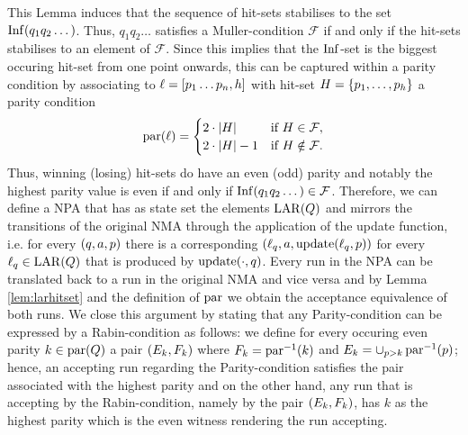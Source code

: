 This Lemma induces that the sequence of hit-sets stabilises to the set
$\operatorname{Inf}(q_{1}q_{2}\dots)$. Thus, $q_{1}q_{2}\dots$ satisfies a Muller-condition
$\mathcal{F}$ if and only if the hit-sets stabilises to an element of
$\mathcal{F}$. Since this implies that the $\operatorname{Inf}$-set is the biggest occuring 
hit-set from one point onwards, this can be captured within a parity
condition by associating to $\ell = \left[p_{1}\dots p_{n},h\right]$ with
hit-set $H = \left\{p_{1},\dots,p_{h}\right\}$ a parity condition
\begin{equation*}
  \operatorname{par}(\ell) = \begin{cases}
    2\cdot\left\vert{H}\right\vert &\text{if }H\in\mathcal{F},\\
    2\cdot\left\vert{H}\right\vert-1 &\text{if }H\notin\mathcal{F}.
  \end{cases}
\end{equation*}
Thus, winning (losing) hit-sets do have an even (odd) parity and notably the
highest parity value is even if and only if
$\operatorname{Inf}(q_{1}q_{2}\dots)\in\mathcal{F}$. Therefore, we can define a \ac{NPA}
that has as state set the elements $\operatorname{LAR}(Q)$ and mirrors the transitions of
the original \ac{NMA} through the application of the update function, i.e.
for every $\left(q, a, p\right)$ there is a corresponding
$\left(\ell_{q}, a, \operatorname{update}(\ell_{q}, p)\right)$ for every $\ell_{q}\in\operatorname{LAR}(Q)$ that
is produced by $\operatorname{update}(\cdot,q)$. Every run in the \ac{NPA} can be translated
back to a run in the original \ac{NMA} and vice versa and by Lemma
\ref{lem:larhitset} and the definition of $\operatorname{par}$ we obtain the acceptance
equivalence of both runs. We close this argument by stating that
any Parity-condition can be expressed by a Rabin-condition as follows:
we define for every occuring even parity $k\in\operatorname{par}(Q)$ a pair
$\left(E_{k}, F_{k}\right)$ where $F_{k} = \operatorname{par}^{-1}(k)$ and
$E_{k} = \cup_{p>k}\operatorname{par}^{-1}(p)$; hence, an accepting run regarding the
Parity-condition satisfies the pair associated with the highest parity and
on the other hand, any run that is accepting by the Rabin-condition, namely
by the pair $\left(E_{k}, F_{k}\right)$, has  $k$ as the highest parity which is
the even witness rendering the run accepting.

